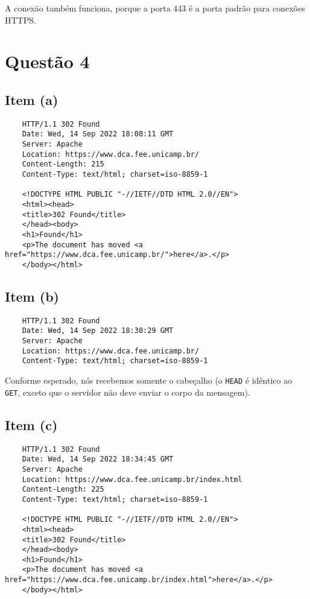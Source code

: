 \documentclass{article}
\begin{document}
A conexão também funciona, porque a porta 443 é a porta padrão para conexões HTTPS.

\section*{Questão 4}

\subsection*{Item (a)}
\begin{verbatim}
    HTTP/1.1 302 Found
    Date: Wed, 14 Sep 2022 18:08:11 GMT
    Server: Apache
    Location: https://www.dca.fee.unicamp.br/
    Content-Length: 215
    Content-Type: text/html; charset=iso-8859-1
    
    <!DOCTYPE HTML PUBLIC "-//IETF//DTD HTML 2.0//EN">
    <html><head>
    <title>302 Found</title>
    </head><body>
    <h1>Found</h1>
    <p>The document has moved <a href="https://www.dca.fee.unicamp.br/">here</a>.</p>
    </body></html>
\end{verbatim}

\subsection*{Item (b)}
\begin{verbatim}
    HTTP/1.1 302 Found
    Date: Wed, 14 Sep 2022 18:30:29 GMT
    Server: Apache
    Location: https://www.dca.fee.unicamp.br/
    Content-Type: text/html; charset=iso-8859-1
\end{verbatim}

Conforme esperado, nós recebemos somente o cabeçalho (o \texttt{HEAD} é idêntico ao \texttt{GET}, exceto que o servidor não deve enviar o corpo da mensagem).

\subsection*{Item (c)}
\begin{verbatim}
    HTTP/1.1 302 Found
    Date: Wed, 14 Sep 2022 18:34:45 GMT
    Server: Apache
    Location: https://www.dca.fee.unicamp.br/index.html
    Content-Length: 225
    Content-Type: text/html; charset=iso-8859-1

    <!DOCTYPE HTML PUBLIC "-//IETF//DTD HTML 2.0//EN">
    <html><head>
    <title>302 Found</title>
    </head><body>
    <h1>Found</h1>
    <p>The document has moved <a href="https://www.dca.fee.unicamp.br/index.html">here</a>.</p>
    </body></html>

\end{verbatim}
\end{document}
